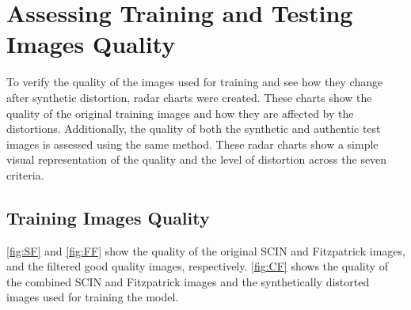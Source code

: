 \section{Assessing Training and Testing Images Quality}
\label{sec:TestingFilteredImages}
To verify the quality of the images used for training and see how they change after synthetic distortion, radar charts were created. These charts show the quality of the original training images and how they are affected by the distortions. Additionally, the quality of both the synthetic and authentic test images is assessed using the same method. These radar charts show a simple visual representation of the quality and the level of distortion across the seven criteria. \par
\subsection{Training Images Quality}
\label{subsec:TrainingImagesQuality}
\autoref{fig:SF} and \autoref{fig:FF} show the quality of the original SCIN and Fitzpatrick images, and the filtered good quality images, respectively. \autoref{fig:CF} shows the quality of the combined SCIN and Fitzpatrick images and the synthetically distorted images used for training the model. \par
